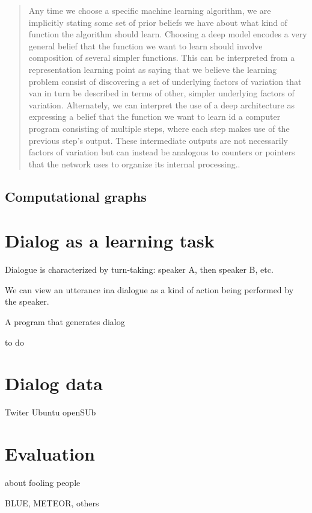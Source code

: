 \begin{quote}
Any time we choose a specific machine learning algorithm, we are implicitly stating some set of prior beliefs we have about what kind of function the algorithm should learn. Choosing a deep model encodes a very general belief that the function we want to learn should involve composition of several simpler functions. This can be interpreted from a representation learning point as saying that we believe the learning problem consist of discovering a set of underlying factors of variation that van in turn be described in terms of other, simpler underlying factors of variation. Alternately, we can interpret  the use of a deep architecture as expressing a belief that the function we want to learn id a computer program consisting of multiple steps, where each step makes use of the previous step's output. These intermediate outputs are not necessarily factors of variation but can instead be analogous to counters or pointers that the network uses to organize its internal processing.\cite[p.~195]{DeepLearningbook}.
\end{quote}


\subsection{Computational graphs}


\section{Dialog as a learning task}

Dialogue is characterized by turn-taking: speaker A, then speaker B, etc.

We can view an utterance ina dialogue as a kind of action being performed by the speaker.

A program that generates dialog

to do 

\section{Dialog data}

Twiter Ubuntu openSUb

\section{Evaluation}

about fooling people 


BLUE, METEOR, others 
